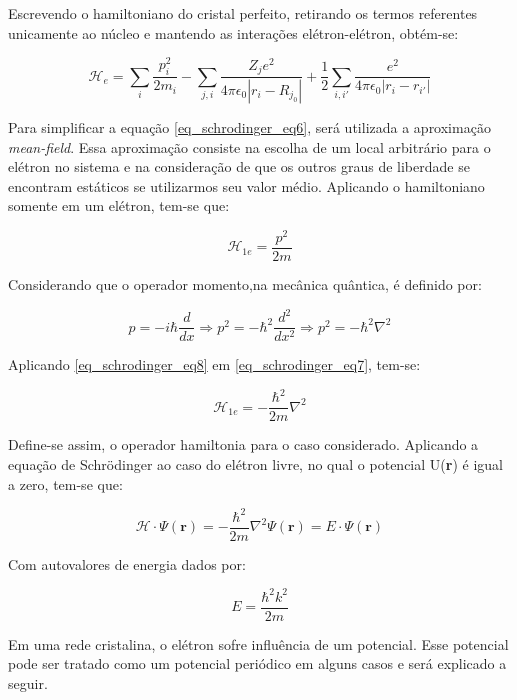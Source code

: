       \par Escrevendo o hamiltoniano do cristal perfeito, retirando os termos referentes unicamente ao núcleo e mantendo as interações elétron-elétron, obtém-se:

      \begin{equation}\label{eq_schrodinger_eq6}
        \mathcal{H}_{e} = 
          \sum_{i} \frac{p_{i}^2}{2m_{i}} 
          -  \sum_{j, i} \frac{Z_{j} e^2}{4\pi\epsilon_{0}\left|r_{i} - R_{j_{0}}\right|} 
          + \frac{1}{2} \sum_{i, i'} \frac{e^2}{4\pi\epsilon_{0}\left|r_{i} - r_{i'}\right|}
      \end{equation}

      \par Para simplificar a equação \eqref{eq_schrodinger_eq6}, será utilizada a aproximação \textit{mean-field}\cite{qm_fis10}. Essa aproximação consiste na escolha de um local arbitrário para o elétron no sistema e na consideração de que os outros graus de liberdade se encontram estáticos se utilizarmos seu valor médio. Aplicando o hamiltoniano somente em um elétron, tem-se que:

      \begin{equation}\label{eq_schrodinger_eq7}
        \mathcal{H}_{1e} = \frac{p^2}{2m}
      \end{equation}

      Considerando que o operador momento,na mecânica quântica, é definido por\cite{qm_fis11}:

      \begin{equation}\label{eq_schrodinger_eq8}
        p = -i\hbar\frac{d}{dx} \Longrightarrow
        p^2 = -\hbar^2 \frac{d^2}{dx^2} \Longrightarrow
        p^2 = -\hbar^2 \nabla^2
      \end{equation}

      Aplicando \eqref{eq_schrodinger_eq8} em \eqref{eq_schrodinger_eq7}, tem-se:

      \begin{equation}\label{eq_schrodinger_eq9}
        \mathcal{H}_{1e} = - \frac{\hbar^2}{2m}\nabla^2
      \end{equation}

      Define-se assim, o operador hamiltonia para o caso considerado. Aplicando a equação de Schrödinger ao caso do elétron livre, no qual o potencial U(\textbf{r}) é igual a zero, tem-se que:

      \begin{equation}\label{eq_schrodinger_eq10}
        \mathcal{H} \cdot \Psi(\mathbf{r}) =
          -\frac{\hbar^2}{2m} \nabla^2 \Psi(\mathbf{r}) =
          E \cdot \Psi(\mathbf{r})
      \end{equation}

      Com autovalores de energia dados por:

      \begin{equation}\label{eq_schrodinger_autovalores}
        E = \frac{\hbar^2 k^2}{2m}
      \end{equation}

      Em uma rede cristalina, o elétron sofre influência de um potencial. Esse potencial pode ser tratado como um potencial periódico\cite{qm_fis5} em alguns casos e será explicado a seguir.